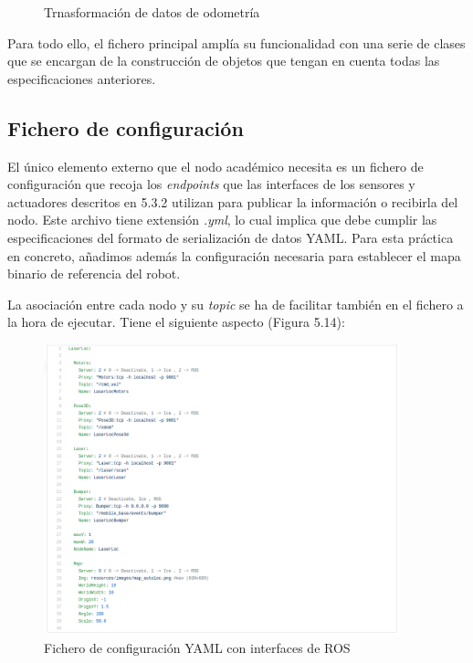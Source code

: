 \begin{enumerate}
\begin{figure}[H]
\begin{center}
		\caption{Trnasformación de datos de odometría}
		\label{fig.odometry2pose}
		\end{center}
	\end{figure}
\end{enumerate}

Para todo ello, el fichero principal amplía su funcionalidad con una serie de clases que se encargan de la construcción de objetos que tengan en cuenta todas las especificaciones anteriores.

\subsection{Fichero de configuración}
El único elemento externo que el nodo académico necesita es un fichero de configuración que recoja los \textit{endpoints} que las interfaces de los sensores y actuadores descritos en 5.3.2 utilizan para publicar la información o recibirla del nodo. Este archivo tiene extensión \textit{.yml}, lo cual implica que debe cumplir las especificaciones del formato de serialización de datos YAML. Para esta práctica en concreto, añadimos además la configuración necesaria para establecer el mapa binario de referencia del robot.

La asociación entre cada nodo y su \textit{topic} se ha de facilitar también en el fichero a la hora de ejecutar. Tiene el siguiente aspecto (Figura 5.14):

\begin{figure}[H]
	\begin{center}
		\includegraphics[width=0.92\textwidth]{figures/llymlfinal.png}
		\caption{Fichero de configuración YAML con interfaces de ROS}
		\label{fig.llymlfinal}
		\end{center}
\end{figure}

